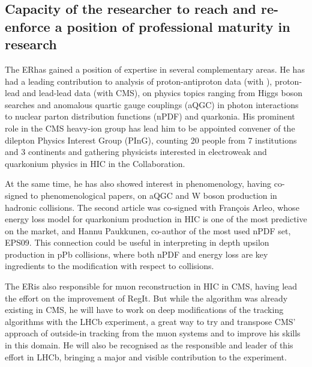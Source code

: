 \documentclass[a4paper,11pt]{article}
\newcommand{\ER}{ER}
\begin{document}
%              
            

\subsection{Capacity of the researcher to reach and re-enforce a position of professional maturity in research}
\label{sec:maturity}

The \ER has gained a position of expertise in several complementary areas. He has had a leading contribution to analysis of proton-antiproton data (with \DO), proton-lead and lead-lead data (with CMS), on physics topics ranging from Higgs boson searches and anomalous quartic gauge couplings (aQGC) in photon interactions to nuclear parton distribution functions (nPDF) and quarkonia. His prominent role in the CMS heavy-ion group has lead him to be appointed convener of the dilepton Physics Interest Group (PInG), counting 20 people from 7 institutions and 3 continents and gathering physicists interested in electroweak and quarkonium physics in HIC in the Collaboration.

At the same time, he has also showed interest in phenomenology, having co-signed to phenomenological papers, on aQGC and W boson production in hadronic collisions. The second article was co-signed with François Arleo, whose energy loss model for quarkonium production in HIC is one of the most predictive on the market, and Hannu Paukkunen, co-author of the most used nPDF set, EPS09. This connection could be useful in interpreting in depth upsilon production in pPb collisions, where both nPDF and energy loss are key ingredients to the modification with respect to \pp collisions.

The \ER is also responsible for muon reconstruction in HIC in CMS, having lead the effort on the improvement of RegIt. But while the algorithm was already existing in CMS, he will have to work on deep modifications of the tracking algorithms with the LHCb experiment, a great way to try and transpose CMS' approach of outside-in tracking from the muon systems and to improve his skills in this domain. He will also be recognised as the responsible and leader of this effort in LHCb, bringing a major and visible contribution to the experiment.
\end{document}
